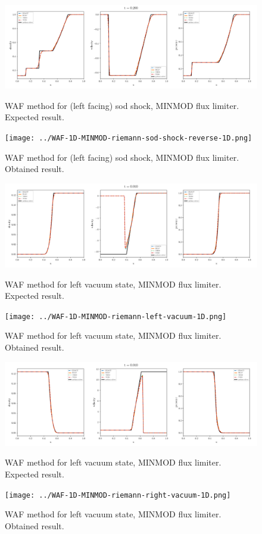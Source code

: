     \begin{figure}[htbp]
        \centering
        \includegraphics[width=.9\textwidth]{./figures/WAF-1D-MINMOD-riemann-sod-shock-reverse-1D.png}%
        \caption{WAF method for (left facing) sod shock, MINMOD flux limiter. Expected result.}
        \texttt{[image: ../WAF-1D-MINMOD-riemann-sod-shock-reverse-1D.png]}%
        \caption{WAF method for (left facing) sod shock, MINMOD flux limiter. Obtained result.}
    \end{figure}



    \begin{figure}[htbp]
        \centering
        \includegraphics[width=.9\textwidth]{./figures/WAF-1D-MINMOD-riemann-left-vacuum-1D.png}%
        \caption{WAF method for left vacuum state, MINMOD flux limiter. Expected result.}
        \texttt{[image: ../WAF-1D-MINMOD-riemann-left-vacuum-1D.png]}
        \caption{WAF method for left vacuum state, MINMOD flux limiter. Obtained result.}
    \end{figure}


    \begin{figure}[htbp]
        \centering
        \includegraphics[width=.9\textwidth]{./figures/WAF-1D-MINMOD-riemann-right-vacuum-1D.png}%
        \caption{WAF method for left vacuum state, MINMOD flux limiter. Expected result.}
        \texttt{[image: ../WAF-1D-MINMOD-riemann-right-vacuum-1D.png]}
        \caption{WAF method for left vacuum state, MINMOD flux limiter. Obtained result.}
    \end{figure}


